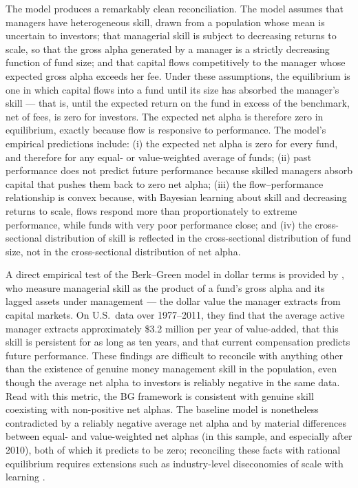 \documentclass[12pt, oneside]{report}
\begin{document}
\noindent The \textcite{BerkGreen2004} model produces a remarkably clean
reconciliation. The model assumes that managers have heterogeneous skill,
drawn from a population whose mean is uncertain to investors; that
managerial skill is subject to decreasing returns to scale, so that the
gross alpha generated by a manager is a strictly decreasing function of
fund size; and that capital flows competitively to the manager whose
expected gross alpha exceeds her fee. Under these assumptions, the
equilibrium is one in which capital flows into a fund until its size has
absorbed the manager's skill --- that is, until the expected return on
the fund in excess of the benchmark, net of fees, is zero for investors.
The expected net alpha is therefore zero in equilibrium, exactly because
flow is responsive to performance. The model's empirical predictions
include: (i) the expected net alpha is zero for every fund, and therefore for
any equal- or value-weighted average of funds; (ii) past performance does not predict future
performance because skilled managers absorb capital that pushes them back
to zero net alpha; (iii) the flow--performance relationship is convex
because, with Bayesian learning about skill and decreasing returns to
scale, flows respond more than proportionately to extreme performance,
while funds with very poor performance close; and (iv) the cross-sectional
distribution of skill is reflected in the cross-sectional distribution of
fund size, not in the cross-sectional distribution of net alpha.

A direct empirical test of the Berk--Green model in dollar terms is
provided by \textcite{BerkVanBinsbergen2015}, who measure managerial skill
as the product of a fund's gross alpha and its lagged assets under
management --- the dollar value the manager extracts from capital markets.
On U.S.\ data over 1977--2011, they find that the average active manager
extracts approximately \$3.2 million per year of value-added, that this
skill is persistent for as long as ten years, and that current
compensation predicts future performance. These findings are difficult to
reconcile with anything other than the existence of genuine money
management skill in the population, even though the average net alpha to
investors is reliably negative in the same data. Read with this metric, the BG framework is consistent with genuine skill
coexisting with non-positive net alphas. The baseline model is
nonetheless contradicted by a reliably negative average net alpha and by
material differences between equal- and value-weighted net alphas (in
this sample, and especially after 2010), both of which it predicts to be zero; reconciling these facts with rational
equilibrium requires extensions such as industry-level diseconomies of
scale with learning \parencite{PastorStambaugh2012}.
\end{document}
